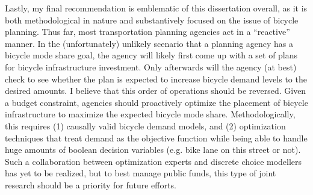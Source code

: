 \documentclass{article}
\begin{document}
Lastly, my final recommendation is emblematic of this dissertation overall, as it is both methodological in nature and substantively focused on the issue of bicycle planning. Thus far, most transportation planning agencies act in a ``reactive'' manner. In the (unfortunately) unlikely scenario that a planning agency has a bicycle mode share goal, the agency will likely first come up with a set of plans for bicycle infrastructure investment. Only afterwards will the agency (at best) check to see whether the plan is expected to increase bicycle demand levels to the desired amounts. I believe that this order of operations should be reversed. Given a budget constraint, agencies should proactively optimize the placement of bicycle infrastructure to maximize the expected bicycle mode share. Methodologically, this requires (1) causally valid bicycle demand models, and (2) optimization techniques that treat demand as the objective function while being able to handle huge amounts of boolean decision variables (e.g. bike lane on this street or not). Such a collaboration between optimization experts and discrete choice modellers has yet to be realized, but to best manage public funds, this type of joint research should be a priority for future efforts.
\end{document}
